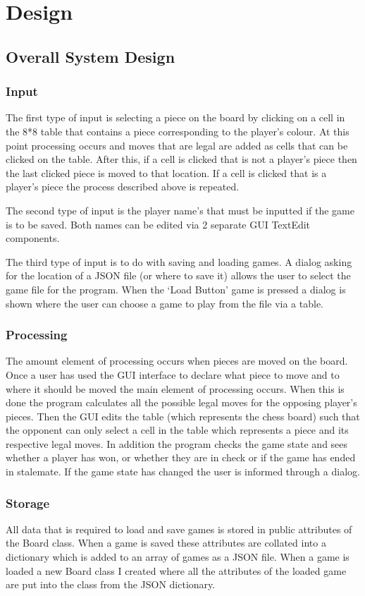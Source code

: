 \documentclass[]{report}
\begin{document}
\chapter{Design}
\section{Overall System Design}
\subsection{Input}
The first type of input is selecting a piece on the board by clicking on a cell in the 8*8 table that contains a piece corresponding to the player’s colour. At this point processing occurs and moves that are legal are added as cells that can be clicked on the table. After this, if a cell is clicked that is not a player’s piece then the last clicked piece is moved to that location. If a cell is clicked that is a player’s piece the process described above is repeated.

The second type of input is the player name’s that must be inputted if the game is to be saved. Both names can be edited via 2 separate GUI TextEdit components. 

The third type of input is to do with saving and loading games. A dialog asking for the location of a JSON file (or where to save it) allows the user to select the game file for the program. When the ‘Load Button’ game is pressed a dialog is shown where the user can choose a game to play from the file via a table.
\subsection{Processing}
The amount element of processing occurs when pieces are moved on the board. Once a user has used the GUI interface to declare what piece to move and to where it should be moved the main element of processing occurs. When this is done the program calculates all the possible legal moves for the opposing player’s pieces. Then the GUI edits the table (which represents the chess board) such that the opponent can only select a cell in the table which represents a piece and its respective legal moves. In addition the program checks the game state and sees whether a player has won, or whether they are in check or if the game has ended in stalemate. If the game state has changed the user is informed through a dialog. 
\subsection{Storage}
All data that is required to load and save games is stored in public attributes of the Board class. When a game is saved these attributes are collated into a dictionary which is added to an array of games as a JSON file. When a game is loaded a new Board class I created where all the attributes of the loaded game are put into the class from the JSON dictionary.
\end{document}
